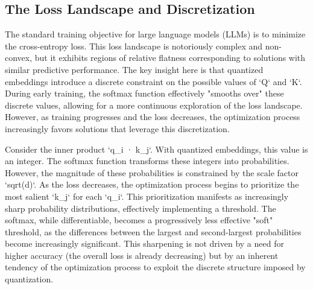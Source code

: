 \subsection{The Loss Landscape and Discretization}













The standard training objective for large language models (LLMs) is to minimize the cross-entropy loss.  This loss landscape is notoriously complex and non-convex, but it exhibits regions of relative flatness corresponding to solutions with similar predictive performance.  The key insight here is that quantized embeddings introduce a discrete constraint on the possible values of `Q` and `K`.  During early training, the softmax function effectively "smooths over" these discrete values, allowing for a more continuous exploration of the loss landscape. However, as training progresses and the loss decreases, the optimization process increasingly favors solutions that leverage this discretization.













Consider the inner product `q_i · k_j`.  With quantized embeddings, this value is an integer.  The softmax function transforms these integers into probabilities.  However, the magnitude of these probabilities is constrained by the scale factor `sqrt(d)`.  As the loss decreases, the optimization process begins to prioritize the most salient `k_j` for each `q_i`.  This prioritization manifests as increasingly sharp probability distributions, effectively implementing a threshold.  The softmax, while differentiable, becomes a progressively less effective "soft" threshold, as the differences between the largest and second-largest probabilities become increasingly significant.  This sharpening is not driven by a need for higher accuracy (the overall loss is already decreasing) but by an inherent tendency of the optimization process to exploit the discrete structure imposed by quantization.













